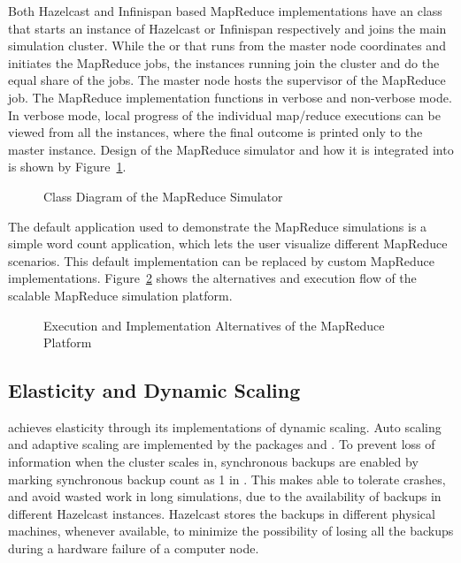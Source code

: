 Both Hazelcast and Infinispan based MapReduce implementations have an  class that starts an instance of Hazelcast or Infinispan respectively and joins the main simulation cluster. While the  or  that runs from the master node coordinates and initiates the MapReduce jobs, the instances running  join the cluster and do the equal share of the jobs. The master node hosts the supervisor of the MapReduce job. The MapReduce implementation functions in verbose and non-verbose mode. In verbose mode, local progress of the individual map/reduce executions can be viewed from all the instances, where the final outcome is printed only to the master instance. Design of the  MapReduce simulator and how it is integrated into  is shown by Figure~\ref{fig:mrclass}.
\begin{figure}[!htbp]
\begin{center}
\end{center}
 \caption{Class Diagram of the MapReduce Simulator}
 \label{fig:mrclass}
\end{figure}

The default application used to demonstrate the MapReduce simulations is a simple word count application, which lets the user visualize different MapReduce scenarios. This default implementation can be replaced by custom MapReduce implementations. Figure~\ref{fig:mrhi} shows the alternatives and execution flow of the scalable MapReduce simulation platform.
\begin{figure}[!htbp]
\begin{center}
\end{center}
 \caption{Execution and Implementation Alternatives of the MapReduce Platform}
 \label{fig:mrhi}
\end{figure}

\subsection{Elasticity and Dynamic Scaling}
 achieves elasticity through its implementations of dynamic scaling. Auto scaling and adaptive scaling are implemented by the packages  and . To prevent loss of information when the cluster scales in, synchronous backups are enabled by marking synchronous backup count as 1 in . This makes  able to tolerate crashes, and avoid wasted work in long simulations, due to the availability of backups in different Hazelcast instances. Hazelcast stores the backups in different physical machines, whenever available, to minimize the possibility of losing all the backups during a hardware failure of a computer node. 

